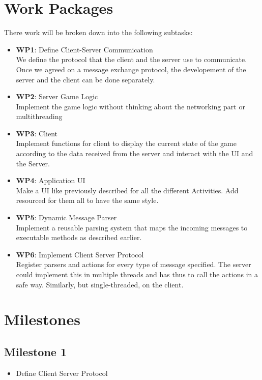 \documentclass{report}
\begin{document}
\section{Work Packages}
There work will be broken down into the following subtasks:

\begin{itemize}
        \item {\bf WP1}: Define Client-Server Communication\\
        We define the protocol that the client and the server use to communicate. Once we agreed on a message exchange protocol, the developement of the server and the client can be done separately.
        \item {\bf WP2}: Server Game Logic\\
        Implement the game logic without thinking about the networking part or multithreading
           
        \item {\bf WP3}: Client\\
	Implement functions for client to display the current state of the game according to the data received from the server and interact with the UI and the Server.
	\item {\bf WP4}: Application UI\\
	Make a UI like previously described for all the different Activities.
Add resourced for them all to have the same style.
        \item {\bf WP5}: Dynamic Message Parser\\
	Implement a reusable parsing system that maps the incoming messages to executable methods as described earlier.
        \item {\bf WP6}: Implement Client Server Protocol\\
	Register parsers and actions for every type of message specified. The server could implement this in multiple threads and has thus to call the actions in a safe way. Similarly, but single-threaded, on the client.
\end{itemize}

\section{Milestones}

\subsection{Milestone 1}
\begin{itemize}
	\item Define Client Server Protocol
\end{itemize}
\end{document}
